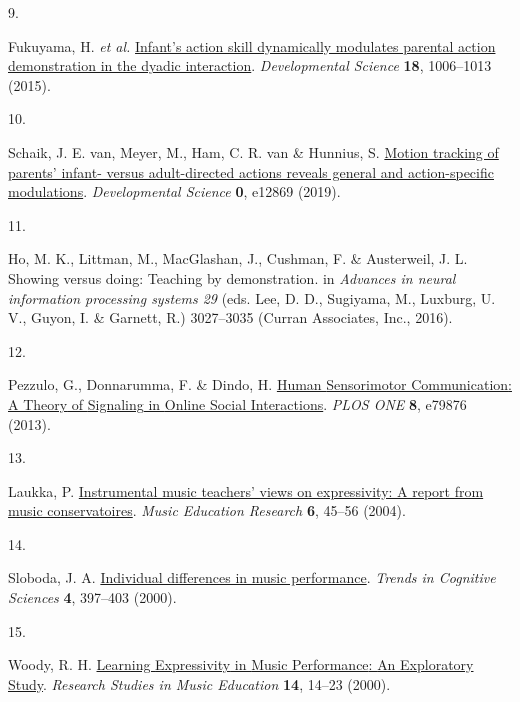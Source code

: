 \documentclass[
  man,floatsintext]{apa6}
\newlength{\cslhangindent}
\newlength{\csllabelwidth}
\newlength{\cslentryspacingunit} %
\newenvironment{CSLReferences}[2] %
 {%
  \setlength{\parindent}{0pt}
  \ifodd #1
  \let\oldpar\par
  \def\par{\hangindent=\cslhangindent\oldpar}
  \fi
  \setlength{\parskip}{#2\cslentryspacingunit}
 }%
 {}
\newcommand{\CSLLeftMargin}[1]{\parbox[t]{\csllabelwidth}{#1}}
\newcommand{\CSLRightInline}[1]{\parbox[t]{\linewidth - \csllabelwidth}{#1}\break}
\begin{document}
\begin{CSLReferences}{0}{0}
\leavevmode{}%
\CSLLeftMargin{9. }%
\CSLRightInline{Fukuyama, H. \emph{et al.} \href{https://doi.org/10.1111/desc.12270}{Infant's action skill dynamically modulates parental action demonstration in the dyadic interaction}. \emph{Developmental Science} \textbf{18}, 1006--1013 (2015).}

\leavevmode{}%
\CSLLeftMargin{10. }%
\CSLRightInline{Schaik, J. E. van, Meyer, M., Ham, C. R. van \& Hunnius, S. \href{https://doi.org/10.1111/desc.12869}{Motion tracking of parents' infant- versus adult-directed actions reveals general and action-specific modulations}. \emph{Developmental Science} \textbf{0}, e12869 (2019).}

\leavevmode{}%
\CSLLeftMargin{11. }%
\CSLRightInline{Ho, M. K., Littman, M., MacGlashan, J., Cushman, F. \& Austerweil, J. L. Showing versus doing: {Teaching} by demonstration. in \emph{Advances in neural information processing systems 29} (eds. Lee, D. D., Sugiyama, M., Luxburg, U. V., Guyon, I. \& Garnett, R.) 3027--3035 ({Curran Associates, Inc.}, 2016).}

\leavevmode{}%
\CSLLeftMargin{12. }%
\CSLRightInline{Pezzulo, G., Donnarumma, F. \& Dindo, H. \href{https://doi.org/10.1371/journal.pone.0079876}{Human {Sensorimotor Communication}: {A Theory} of {Signaling} in {Online Social Interactions}}. \emph{PLOS ONE} \textbf{8}, e79876 (2013).}

\leavevmode{}%
\CSLLeftMargin{13. }%
\CSLRightInline{Laukka, P. \href{https://doi.org/10.1080/1461380032000182821}{Instrumental music teachers' views on expressivity: A report from music conservatoires}. \emph{Music Education Research} \textbf{6}, 45--56 (2004).}

\leavevmode{}%
\CSLLeftMargin{14. }%
\CSLRightInline{Sloboda, J. A. \href{https://doi.org/10.1016/S1364-6613(00)01531-X}{Individual differences in music performance}. \emph{Trends in Cognitive Sciences} \textbf{4}, 397--403 (2000).}

\leavevmode{}%
\CSLLeftMargin{15. }%
\CSLRightInline{Woody, R. H. \href{https://doi.org/10.1177/1321103X0001400102}{Learning {Expressivity} in {Music Performance}: {An Exploratory Study}}. \emph{Research Studies in Music Education} \textbf{14}, 14--23 (2000).}


\end{CSLReferences}
\end{document}
